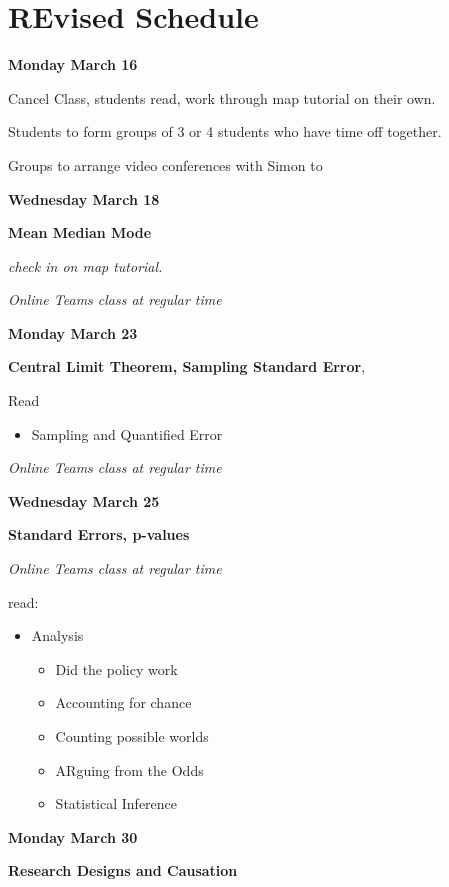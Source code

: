 \documentclass[
]{article}
\date{}
\begin{document}
\hypertarget{header-n0}{%
\section{REvised Schedule}\label{header-n0}}

\textbf{Monday March 16}

Cancel Class, students read, work through map tutorial on their own.

Students to form groups of 3 or 4 students who have time off together.

Groups to arrange video conferences with Simon to

\textbf{Wednesday March 18}

\textbf{Mean Median Mode}

\emph{check in on map tutorial.}

\emph{Online Teams class at regular time}

\textbf{Monday March 23}

\textbf{Central Limit Theorem, Sampling Standard Error},

Read

\begin{itemize}
\item
  Sampling and Quantified Error
\end{itemize}

\emph{Online Teams class at regular time}

\textbf{Wednesday March 25}

\textbf{Standard Errors, p-values}

\emph{Online Teams class at regular time}

read:

\begin{itemize}
\item
  Analysis

  \begin{itemize}
  \item
    Did the policy work
  \item
    Accounting for chance
  \item
    Counting possible worlds
  \item
    ARguing from the Odds
  \item
    Statistical Inference
  \end{itemize}
\end{itemize}

\textbf{Monday March 30}

\textbf{Research Designs and Causation}
\end{document}
